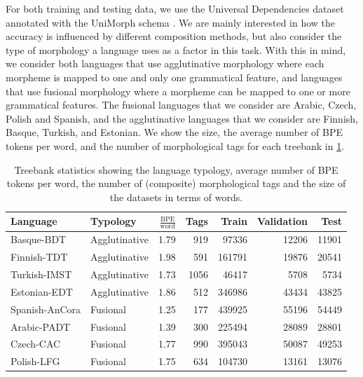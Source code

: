\documentclass[11pt]{article}
\newcommand\citep{\cite}
\begin{document}
            For both training and testing data, we use the Universal
     Dependencies dataset \citep{nivre2018} annotated with the
     UniMorph schema \citep{mccarthy2018marrying}.  We are mainly
     interested in how the accuracy is influenced by different
     composition methods, but also consider the type of morphology a
     language uses as a factor in this task.
%
    With this in mind, we consider both
     languages that use agglutinative morphology where each morpheme
     is mapped to one and only one grammatical feature, and
     languages that use fusional morphology where a morpheme can be
     mapped to one or more grammatical features. 
%
%
           	The fusional languages that we consider are Arabic, Czech,
     Polish and Spanish, and the agglutinative languages that we
     consider are Finnish, Basque, Turkish, and Estonian.  We show the
     size, the average number of BPE tokens per word, and the number of
     morphological tags for each treebank in \cref{tab:data}.
    
    
    \begin{table}
		\centering
		\begin{tabular}{l|lrrrrr}
			Language & Typology & $\frac{\textrm{BPE}}{\textrm{word}}$ & Tags & Train & Validation & Test \\
			\hline
			Basque-BDT      & Agglutinative & 1.79 & 919 & 97336 & 12206 & 11901 \\
			Finnish-TDT     & Agglutinative & 1.98 & 591 & 161791 & 19876 & 20541 \\
			Turkish-IMST    & Agglutinative & 1.73 & 1056 & 46417 & 5708 & 5734 \\
			Estonian-EDT    & Agglutinative & 1.86 & 512 & 346986 & 43434 & 43825 \\
    		Spanish-AnCora  & Fusional & 1.25 & 177 & 439925 & 55196 & 54449 \\ 
            Arabic-PADT     & Fusional & 1.39 & 300 & 225494 & 28089 & 28801  \\
			Czech-CAC       & Fusional & 1.77 & 990 & 395043 & 50087 & 49253 \\
			Polish-LFG      & Fusional & 1.75 & 634 & 104730 & 13161 & 13076 \\
        \end{tabular}
        \caption{\label{tab:data} Treebank statistics showing the
     language typology, average number of BPE tokens per word, the
     number of (composite) morphological tags and the size of the
     datasets in terms of words.}
	\end{table}
    
\end{document}
